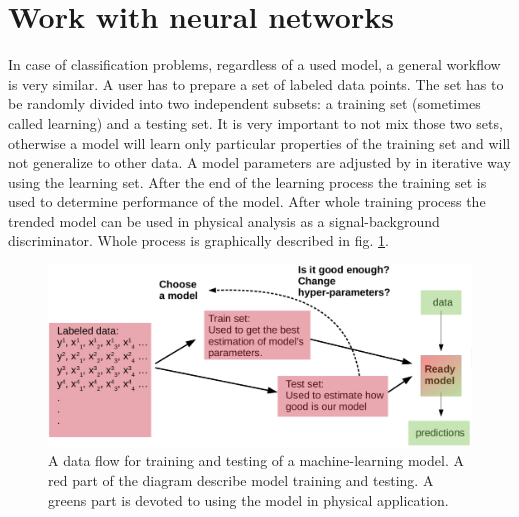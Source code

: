 \section{Work with neural networks}
In case of classification problems, regardless of a used model, a general workflow is very similar. A user has to prepare a set of labeled data points. The set has to be randomly divided into two independent subsets: a training set (sometimes called learning) and a testing set. It is very important to not mix those two sets, otherwise a model will learn only particular properties of the training set and will not generalize to other data. A model parameters are adjusted by in iterative way using the learning set. After the end of the learning process the training set is used to determine performance of the model. After whole training process the trended model can be used in physical analysis as a signal-background discriminator. Whole process is graphically described in fig. \ref{fig:data_flow}.

\begin{figure}[ht]
  \centering
  \includegraphics[width=1 \linewidth]{Chapter_NN/data_flow.eps}
  \caption{A data flow for training and testing of a machine-learning model. A red part of the diagram describe model training and testing. A greens part is devoted to using the model in physical application.}
  \label{fig:data_flow}
\end{figure}


